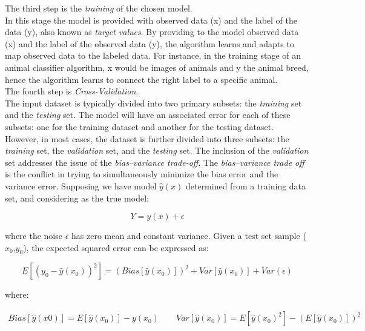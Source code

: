 The third step is the \textit{training} of the chosen model.\\
In this stage the model is provided with observed data (x) and the label of the data (y), also known as \textit{target values}.
By providing to the model observed data (x) and the label of the observed data (y), the algorithm learns and adapts to map observed data to the labeled data.
For instance, in the training stage of an animal classifier algorithm, x would be images of animals and y the animal breed, hence the algorithm 
learns to connect the right label to a specific animal.\\

The fourth step is \textit{Cross-Validation}.\\
The input dataset is typically divided into two primary subsets: the \textit{training} set and the \textit{testing} set. 
The model will have an associated error for each of these subsets: one for the training dataset and another for the testing dataset.
However, in most cases, the dataset is further divided into three subsets: the \textit{training} set, the \textit{validation} set, and 
the \textit{testing} set. The inclusion of the \textit{validation} set addresses the issue of the \textit{bias–variance trade-off}.
The \textit{bias–variance trade off} is the conflict in trying to simultaneously minimize the bias error and the variance error.
Supposing we have model $\hat{y}(x)$ determined from a training data set, and considering as the true model:

\begin{equation}
    Y = y(x) + \epsilon
\end{equation}

where the noise $\epsilon$ has zero mean and constant variance.
Given a test set sample ($x_0$,$y_0$), the expected squared error can be expressed as:

\begin{equation}
    E[(y_0 - \hat{y}(x_0))^2] = (Bias[\hat{y}(x_0)])^2 + Var[\hat{y}(x_0)] + Var(\epsilon) 
\label{eq:variance-bias}
\end{equation}

where:

\begin{align}
Bias[\hat{y}(x0)] = E[\hat{y}(x_0)] - y(x_0)
\qquad
Var[\hat{y}(x_0)] = E[\hat{y}(x_0)^2] - (E[\hat{y}(x_0)])^2
\label{eq:variance-bias-errors}
\end{align}

